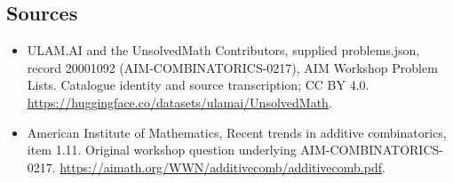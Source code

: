 \documentclass[11pt,a4paper]{article}
\begin{document}
\subsection{Sources}
\begin{itemize}
\item[S1] ULAM.AI and the UnsolvedMath Contributors, supplied problems.json, record 20001092 (AIM-COMBINATORICS-0217), AIM Workshop Problem Lists. Catalogue identity and source transcription; CC BY 4.0.
\url{https://huggingface.co/datasets/ulamai/UnsolvedMath}.
\item[S2] American Institute of Mathematics, Recent trends in additive combinatorics, item 1.11. Original workshop question underlying AIM-COMBINATORICS-0217.
\url{https://aimath.org/WWN/additivecomb/additivecomb.pdf}.
\end{itemize}
\end{document}
